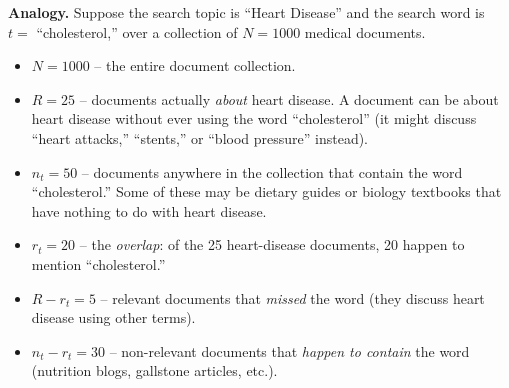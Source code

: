 \documentclass[11pt, a4paper]{article}
\begin{document}
\textbf{Analogy.} Suppose the search topic is ``Heart Disease'' and the search word is $t=$ ``cholesterol,'' over a collection of $N=1000$ medical documents.
\begin{itemize}
\item $N = 1000$ -- the entire document collection.
\item $R = 25$ -- documents actually \emph{about} heart disease. A document can be about heart disease without ever using the word ``cholesterol'' (it might discuss ``heart attacks,'' ``stents,'' or ``blood pressure'' instead).
\item $n_t = 50$ -- documents anywhere in the collection that contain the word ``cholesterol.'' Some of these may be dietary guides or biology textbooks that have nothing to do with heart disease.
\item $r_t = 20$ -- the \emph{overlap}: of the 25 heart-disease documents, 20 happen to mention ``cholesterol.''
\item $R - r_t = 5$ -- relevant documents that \emph{missed} the word (they discuss heart disease using other terms).
\item $n_t - r_t = 30$ -- non-relevant documents that \emph{happen to contain} the word (nutrition blogs, gallstone articles, etc.).
\end{itemize}

\begin{center}
\end{center}
\end{document}
